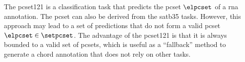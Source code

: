 
The \gls{pcset121} is a classification task that predicts
the \gls{pcset} $\elpcset$ of a \gls{rna} annotation. The
\gls{pcset} can also be derived from the \gls{satb35} tasks.
However, this approach may lead to a set of predictions that
do not form a valid \gls{pcset} $\elpcset \in \setpcset$.
The advantage of the \gls{pcset121} is that it is always
bounded to a valid set of \gls{pcset}s, which is useful as a
``fallback'' method to generate a chord annotation that does
not rely on other tasks.




